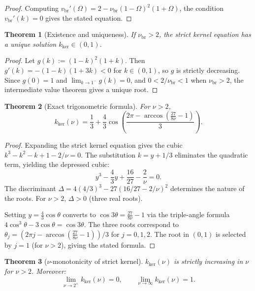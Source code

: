 \documentclass[12pt]{article}
\theoremstyle{plain}
\newtheorem{theorem}{Theorem}[section]
\theoremstyle{definition}
\numberwithin{equation}{section}
\newcommand{\br}{\mathrm{br}}
\newcommand{\kker}{\mathrm{ker}}
\begin{document}
\begin{proof}
Computing $v_{\br}'(\Omega) = 2 - \nu_{\br}(1-\Omega)^2(1+\Omega)$, the condition $v_{\br}'(k)=0$ gives the stated equation.
\end{proof}

\begin{theorem}[Existence and uniqueness]\label{thm:existence}
If $\nu_{\br}>2$, the strict kernel equation has a unique solution $k_{\kker}\in(0,1)$.
\end{theorem}

\begin{proof}
Let $g(k):=(1-k)^2(1+k)$.  Then $g'(k)=-(1-k)(1+3k)<0$ for $k\in(0,1)$, so $g$ is strictly decreasing.  Since $g(0)=1$ and $\lim_{k\to 1^-}g(k)=0$, and $0<2/\nu_{\br}<1$ when $\nu_{\br}>2$, the intermediate value theorem gives a unique root.
\end{proof}

\begin{theorem}[Exact trigonometric formula]\label{thm:trigformula}
For $\nu>2$,
\begin{equation}
\boxed{k_{\kker}(\nu) = \frac{1}{3} + \frac{4}{3}\cos\!\left(\frac{2\pi-\arccos\!\left(\frac{27}{8\nu}-1\right)}{3}\right).}
\end{equation}
\end{theorem}

\begin{proof}
Expanding the strict kernel equation gives the cubic $k^3-k^2-k+1-2/\nu=0$.  The substitution $k=y+1/3$ eliminates the quadratic term, yielding the depressed cubic:
\begin{equation}
y^3-\frac{4}{3}y+\frac{16}{27}-\frac{2}{\nu}=0.
\end{equation}
The discriminant $\Delta=4(4/3)^3-27(16/27-2/\nu)^2$ determines the nature of the roots.  For $\nu>2$, $\Delta>0$ (three real roots).

Setting $y=\frac{4}{3}\cos\theta$ converts to $\cos 3\theta=\frac{27}{8\nu}-1$ via the triple-angle formula $4\cos^3\theta-3\cos\theta=\cos 3\theta$.  The three roots correspond to $\theta_j=(2\pi j-\arccos(\frac{27}{8\nu}-1))/3$ for $j=0,1,2$.  The root in $(0,1)$ is selected by $j=1$ (for $\nu>2$), giving the stated formula.
\end{proof}

\begin{theorem}[$\nu$-monotonicity of strict kernel]\label{thm:numonotone}
$k_{\kker}(\nu)$ is strictly increasing in $\nu$ for $\nu>2$.  Moreover:
\begin{equation}
\lim_{\nu\to 2^+}k_{\kker}(\nu)=0,\qquad \lim_{\nu\to\infty}k_{\kker}(\nu)=1.
\end{equation}
\end{theorem}
\end{document}
